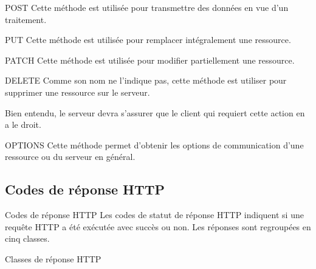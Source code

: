 \documentclass{beamer}
\begin{document}
\begin{frame}{POST}
Cette méthode est utilisée pour transmettre des données en vue d'un traitement.
\end{frame}

\begin{frame}{PUT}
Cette méthode est utilisée pour remplacer intégralement une ressource.
\end{frame}

\begin{frame}{PATCH}
Cette méthode est utilisée pour modifier partiellement une ressource.
\end{frame}

\begin{frame}{DELETE}
Comme son nom ne l'indique pas, cette méthode est utiliser pour supprimer une ressource sur le serveur.

Bien entendu, le serveur devra s'assurer que le client qui requiert cette action en a le droit.
\end{frame}

\begin{frame}{OPTIONS}
Cette méthode permet d'obtenir les options de communication d'une ressource ou du serveur en général.
\end{frame}

\subsection{Codes de réponse HTTP}
\begin{frame}{Codes de réponse HTTP}
  Les codes de statut de réponse HTTP indiquent si une requête HTTP a été exécutée avec succès ou non. Les réponses sont regroupées en cinq classes.
\end{frame}

\begin{frame}{Classes de réponse HTTP}
\begin{itemize}
\end{itemize}
\end{frame}
\end{document}
